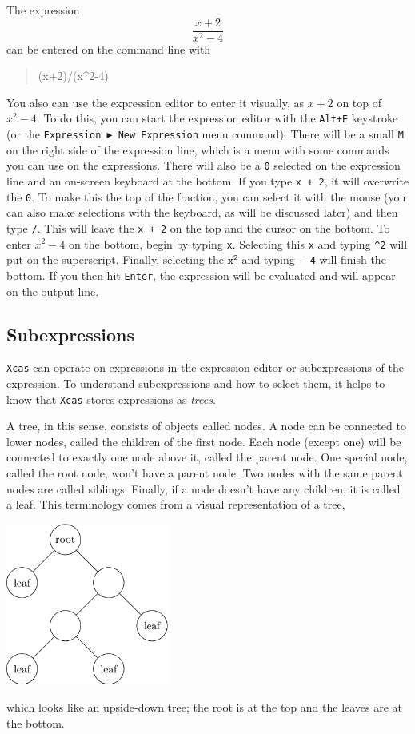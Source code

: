 \documentclass[a4paper,11pt]{book}
\newenvironment{giaccmd}
{\begin{quote}\ttfamily}
{\end{quote}}
\begin{document}
The expression
\[\frac{x+2}{x^2-4}\]
can be entered on the command line with
\begin{giaccmd}
(x+2)/(x\^{}2-4)
\end{giaccmd}
You also can use the expression editor to
enter it visually, as $x+2$ on top of $x^2 - 4$.  To do this, you can
start the expression editor with the \texttt{Alt+E} keystroke (or the
\texttt{Expression $\blacktriangleright$ New Expression} menu
command).  There will be a small \texttt{M} on the right side of the
expression line, which is a menu with some commands you can use on the
expressions.  There will also be a \texttt{0} selected on the
expression line and an on-screen keyboard at the bottom.  If you type
\texttt{x + 2}, it will overwrite the \texttt{0}.  To make this the
top of the fraction, you can select it with the mouse (you can also
make selections with the keyboard, as will be discussed later) and
then type \texttt{/}.  This will leave the \texttt{x + 2} on the top
and the cursor on the bottom.  To enter $x^2 - 4$ on the bottom, begin
by typing \texttt{x}.  Selecting this \texttt{x} and typing
\texttt{\^{}2} will put on the superscript.  Finally, selecting the
$\texttt{x}^{\texttt{2}}$ and typing \texttt{- 4} will finish the
bottom.  If you then hit \texttt{Enter}, the expression will be
evaluated and will appear on the output line.

\subsection{Subexpressions}

\texttt{Xcas} can operate on expressions in the expression editor or
subexpressions of the expression.  To understand subexpressions and
how to select them, it helps to know that \texttt{Xcas} stores
expressions as \textsl{trees}.

A tree, in this sense, consists of objects
called nodes.  A node can be connected to lower nodes, called the
children of the first node. Each node (except one) will be connected
to exactly one node above it, called the parent node.  One special
node, called the root node, won't have a parent node.  Two nodes with
the same parent nodes are called siblings.  Finally, if a node doesn't
have any children, it is called a leaf.  This terminology comes from a
visual representation of a tree,
\begin{center}
  \includegraphics[width=0.4\textwidth]{tree.png}
\end{center}
which looks like an upside-down tree; the root is at the
top and the leaves are at the bottom. 
\end{document}
